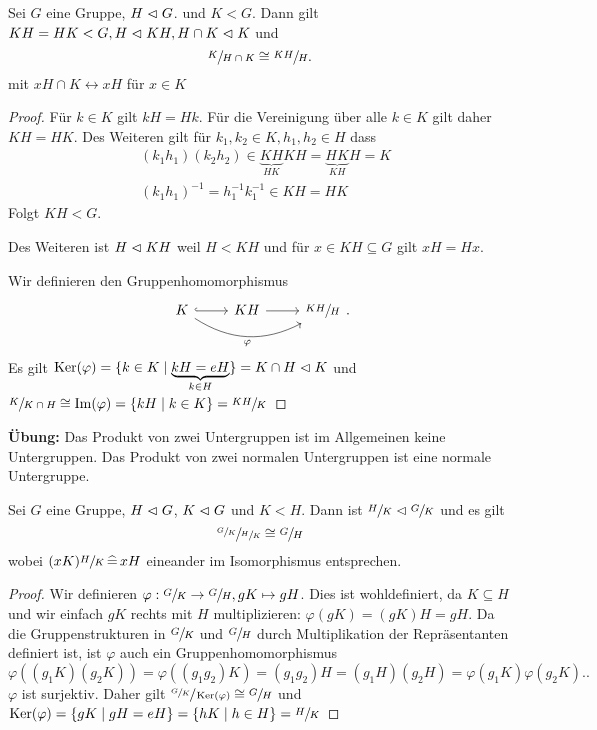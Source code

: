 \begin{corollary}
	Sei $G$ eine Gruppe, $H \vartriangleleft G$. und $K < G$.
	Dann gilt $K H = H K < G, H \vartriangleleft KH, H \cap K \vartriangleleft K $ und 
	\[
	\sfrac{K}{H \cap K} \cong \sfrac{KH}{H}
	.\] 
	mit $x H \cap K \leftrightarrow x H$ für $x \in K$
\end{corollary}

\begin{proof}
	Für $k \in K$ gilt $kH = Hk$. 
	Für die Vereinigung über alle $k \in K$ gilt daher $KH = HK$.
	Des Weiteren gilt für  $k_1, k_2 \in K, h_1,h_2 \in H$ dass
	\begin{align*}
		&(k_1 h_1) (k_2 h_2) \in \underbrace{KH}_{HK} KH = \underbrace{HK}_{KH} H = K\\
		&(k_1 h_1)^{-1} = h_1^{-1} k_1^{-1} \in KH = HK
	\end{align*}
	Folgt $KH < G$.

	Des Weiteren ist $H \vartriangleleft KH$ weil $H < KH$ und für $x \in KH \subseteq G$ gilt $xH = Hx$.

	Wir definieren den Gruppenhomomorphismus
	\[
		\begin{tikzcd}
			K \arrow[r, hook] \arrow[rr, "\varphi"', bend right] & KH \arrow[r] & \sfrac{KH}{H}
		\end{tikzcd}
	.\] 
	Es gilt $\operatorname{Ker}(\varphi) = \{k \in K \mid \underbrace{k H = e H}_{k \in H}\} = K \cap H \vartriangleleft K$
	und $\sfrac{K}{K \cap H} \cong \Im(\varphi) = \{k H \mid k \in K\}  = \sfrac{KH}{K}$
\end{proof}

\textbf{Übung:}
 Das Produkt von zwei Untergruppen ist im Allgemeinen keine Untergruppen.
 Das Produkt von zwei normalen Untergruppen ist eine normale Untergruppe.

 \begin{corollary}
 	Sei $G$ eine Gruppe, $H \vartriangleleft G$, $K \vartriangleleft G$ und $K < H$.
	Dann ist $\sfrac{H}{K} \vartriangleleft \sfrac{G}{K}$ und es gilt
	\[
	\sfrac{\sfrac{G}{K}}{\sfrac{H}{K}} \cong \sfrac{G}{H}
	\] 
	wobei $(xK) \sfrac{H}{K} \, \widehat{=} \, x H$ eineander im Isomorphismus entsprechen.
 \end{corollary}

\begin{proof}
	Wir definieren $ \varphi: \sfrac{G}{K} \to  \sfrac{G}{H}, gK \mapsto gH$.
	Dies ist wohldefiniert, da $K \subseteq H$ und wir einfach $gK$ rechts mit $H$ multiplizieren:
	$\varphi(gK) = (gK)H = gH$.
	Da die Gruppenstrukturen in $\sfrac{G}{K}$ und $\sfrac{G}{H}$ durch Multiplikation der Repräsentanten definiert ist,
	ist $\varphi$ auch ein Gruppenhomomorphismus
	\[
		\varphi((g_1 K)(g_2 K)) = \varphi((g_1 g_2)K) = (g_1 g_2) H = (g_1 H) (g_2 H) = \varphi(g_1 K) \varphi(g_2 K).
	.\] 
	$\varphi$ ist surjektiv. Daher gilt $\sfrac{\sfrac{G}{K}}{\operatorname{Ker}(\varphi)} \cong \sfrac{G}{H}$ und $\operatorname{Ker}(\varphi) = \{gK \mid gH = e H\} = \{hK \mid h \in H\} = \sfrac{H}{K}$
\end{proof}

